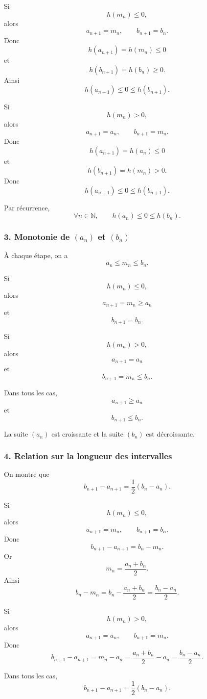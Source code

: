 \documentclass[11pt,a4paper]{article}
\newcommand{\N}{\mathbb{N}}
\begin{document}
Si
\[
h(m_n)\leq0,
\]
alors
\[
a_{n+1}=m_n,\qquad b_{n+1}=b_n.
\]
Donc
\[
h(a_{n+1})=h(m_n)\leq0
\]
et
\[
h(b_{n+1})=h(b_n)\geq0.
\]
Ainsi
\[
h(a_{n+1})\leq0\leq h(b_{n+1}).
\]

Si
\[
h(m_n)>0,
\]
alors
\[
a_{n+1}=a_n,\qquad b_{n+1}=m_n.
\]
Donc
\[
h(a_{n+1})=h(a_n)\leq0
\]
et
\[
h(b_{n+1})=h(m_n)>0.
\]
Donc
\[
h(a_{n+1})\leq0\leq h(b_{n+1}).
\]

Par récurrence,
\[
\forall n\in\N,\qquad h(a_n)\leq0\leq h(b_n).
\]


\subsubsection*{3. Monotonie de \((a_n)\) et \((b_n)\)}

À chaque étape, on a
\[
a_n\leq m_n\leq b_n.
\]

Si
\[
h(m_n)\leq0,
\]
alors
\[
a_{n+1}=m_n\geq a_n
\]
et
\[
b_{n+1}=b_n.
\]

Si
\[
h(m_n)>0,
\]
alors
\[
a_{n+1}=a_n
\]
et
\[
b_{n+1}=m_n\leq b_n.
\]

Dans tous les cas,
\[
a_{n+1}\geq a_n
\]
et
\[
b_{n+1}\leq b_n.
\]

\begin{resultatbox}
La suite \((a_n)\) est croissante et la suite \((b_n)\) est décroissante.
\end{resultatbox}


\subsubsection*{4. Relation sur la longueur des intervalles}

On montre que
\[
b_{n+1}-a_{n+1}=\frac12(b_n-a_n).
\]

Si
\[
h(m_n)\leq0,
\]
alors
\[
a_{n+1}=m_n,\qquad b_{n+1}=b_n.
\]
Donc
\[
b_{n+1}-a_{n+1}
=
b_n-m_n.
\]
Or
\[
m_n=\frac{a_n+b_n}{2}.
\]
Ainsi
\[
b_n-m_n
=
b_n-\frac{a_n+b_n}{2}
=
\frac{b_n-a_n}{2}.
\]

Si
\[
h(m_n)>0,
\]
alors
\[
a_{n+1}=a_n,\qquad b_{n+1}=m_n.
\]
Donc
\[
b_{n+1}-a_{n+1}
=
m_n-a_n
=
\frac{a_n+b_n}{2}-a_n
=
\frac{b_n-a_n}{2}.
\]

Dans tous les cas,
\[
b_{n+1}-a_{n+1}=\frac12(b_n-a_n).
\]

\end{document}
